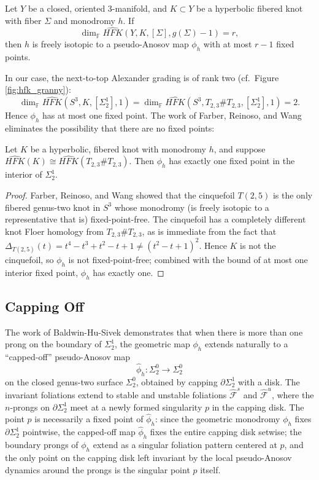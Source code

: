 \begin{theorem}
    Let $Y$ be a closed, oriented 3-manifold, and $K \subset Y$ be a hyperbolic fibered knot with fiber $\Sigma$ and monodromy $h$. If
    \[
    \dim_{\mathbb{F}} \widehat{HFK}(Y, K, [\Sigma], g(\Sigma) - 1) = r,
    \]
    then $h$ is freely isotopic to a pseudo-Anosov map $\phi_h$ with at most $r - 1$ fixed points.
\end{theorem}

In our case, the next-to-top Alexander grading is of rank two (cf.\ Figure \ref{fig:hfk_granny}):
\[
    \dim_{\mathbb{F}} \widehat{HFK}(S^3, K, [\Sigma_2^1], 1)= \dim_{\mathbb{F}} \widehat{HFK}(S^3, T_{2,3} \# T_{2,3}, [\Sigma_2^1], 1) = 2.
\]
Hence $\phi_h$ has at most one fixed point. The work of Farber, Reinoso, and Wang \cite{farber2024fixed} eliminates the possibility that there are no fixed points:

\begin{lemma}\label{lemma:original monodromy has one fixed point}
    Let $K$ be a hyperbolic, fibered knot with monodromy $h$, and suppose $\widehat{HFK}(K) \cong \widehat{HFK}(T_{2,3} \# T_{2,3})$. Then $\phi_h$ has exactly one fixed point in the interior of $\Sigma_2^1$.
\end{lemma}
\begin{proof}
    Farber, Reinoso, and Wang \cite{farber2024fixed} showed that the cinquefoil $T(2,5)$ is the only fibered genus-two knot in $S^3$ whose monodromy (is freely isotopic to a representative that is) fixed-point-free. The cinquefoil has a completely different knot Floer homology from $T_{2,3} \# T_{2,3}$, as is immediate from the fact that $\Delta_{T(2,5)}(t) = t^4 - t^3 + t^2 - t + 1 \neq (t^2 - t + 1)^2$. Hence $K$ is not the cinquefoil, so $\phi_h$ is not fixed-point-free; combined with the bound of at most one interior fixed point, $\phi_h$ has exactly one.
\end{proof}

\subsection*{Capping Off}\label{subsec:capping_off}
The work of Baldwin-Hu-Sivek \cite{baldwin2025khovanov} demonstrates that when there is more than one prong on the boundary of $\Sigma_2^1$, the geometric map $\phi_h$ extends naturally to a ``capped-off'' pseudo-Anosov map
\[
\hat{\phi}_h \colon \Sigma_2^0 \to \Sigma_2^0
\]
on the closed genus-two surface $\Sigma_2^0$, obtained by capping $\partial \Sigma_2^1$ with a disk. The invariant foliations extend to stable and unstable foliations $\hat{\mathcal{F}}^s$ and $\hat{\mathcal{F}}^u$, where the $n$-prongs on $\partial \Sigma_2^1$ meet at a newly formed singularity $p$ in the capping disk. The point $p$ is necessarily a fixed point of $\hat{\phi}_h$: since the geometric monodromy $\phi_h$ fixes $\partial \Sigma_2^1$ pointwise, the capped-off map $\hat{\phi}_h$ fixes the entire capping disk setwise; the boundary prongs of $\phi_h$ extend as a singular foliation pattern centered at $p$, and the only point on the capping disk left invariant by the local pseudo-Anosov dynamics around the prongs is the singular point $p$ itself.

